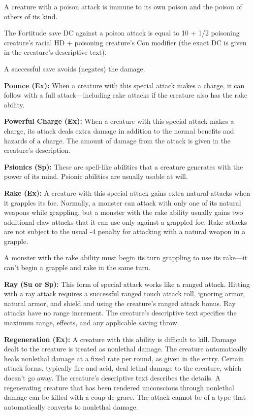 \documentclass{article}
\begin{document}
A creature with a poison attack is immune to its own poison and the poison of others 
of its kind.

The Fortitude save DC against a poison attack is equal to 10 + 1/2 poisoning creature's 
racial HD + poisoning creature's Con modifier (the exact DC is given in the creature's 
descriptive text).

A successful save avoids (negates) the damage.

\vspace{12pt}
\textbf{Pounce (Ex):} When a creature with this special attack makes a charge, 
it can follow with a full attack---including rake attacks if the creature also 
has the rake ability.

\vspace{12pt}
\textbf{Powerful Charge (Ex):} When a creature with this special attack makes a 
charge, its attack deals extra damage in addition to the normal benefits and hazards 
of a charge. The amount of damage from the attack is given in the creature's description.

\vspace{12pt}
\textbf{Psionics (Sp):} These are spell-like abilities that a creature generates 
with the power of its mind. Psionic abilities are usually usable at will.

\vspace{12pt}
\textbf{Rake (Ex):} A creature with this special attack gains extra natural attacks 
when it grapples its foe. Normally, a monster can attack with only one of its natural 
weapons while grappling, but a monster with the rake ability usually gains two 
additional claw attacks that it can use only against a grappled foe. Rake attacks 
are not subject to the usual -4 penalty for attacking with a natural weapon in 
a grapple.

A monster with the rake ability must begin its turn grappling to use its rake---it 
can't begin a grapple and rake in the same turn.

\vspace{12pt}
\textbf{Ray (Su or Sp):} This form of special attack works like a ranged attack. 
Hitting with a ray attack requires a successful ranged touch attack roll, ignoring 
armor, natural armor, and shield and using the creature's ranged attack bonus. 
Ray attacks have no range increment. The creature's descriptive text specifies 
the maximum range, effects, and any applicable saving throw.

\vspace{12pt}
\textbf{Regeneration (Ex): }A creature with this ability is difficult to kill. 
Damage dealt to the creature is treated as nonlethal damage. The creature automatically 
heals nonlethal damage at a fixed rate per round, as given in the entry. Certain 
attack forms, typically fire and acid, deal lethal damage to the creature, which 
doesn't go away. The creature's descriptive text describes the details. A regenerating 
creature that has been rendered unconscious through nonlethal damage can be killed 
with a coup de grace. The attack cannot be of a type that automatically converts 
to nonlethal damage.
\end{document}
